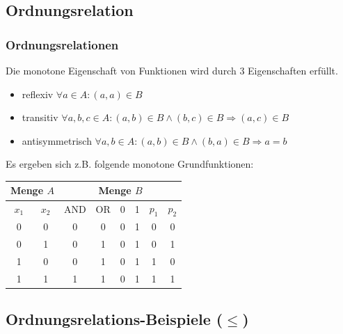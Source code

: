 \documentclass[hyperref={pdfpagelabels=false}]{beamer} %
\begin{document}
  \subsection{Ordnungsrelation}
  \begin{frame}%
    \frametitle{Ordnungsrelationen}
    Die monotone Eigenschaft von Funktionen wird durch 3 Eigenschaften erfüllt.
    \begin{itemize}
      \item reflexiv $\forall a \in A: (a,a) \in B$\\
      \item transitiv $\forall a,b,c \in A: (a,b) \in B \land (b,c) \in B \Rightarrow (a,c) \in B$\\
      \item antisymmetrisch $\forall a,b \in A: (a,b) \in B \land (b,a) \in B \Rightarrow a=b$\\
    \end{itemize}
    Es ergeben sich z.B. folgende monotone Grundfunktionen:\\
    \begin{tabular}[t]{|cc|c|c|c|c|c|c|} \hline
      \multicolumn{2}{|c|}{Menge $A$} & \multicolumn{6}{|c|}{Menge $B$} \\ \hline
      $x_1$     & $x_2$ & AND   & OR    & 0     & 1     & $p_1$ & $p_2$\\ \hline
      0         & 0     & 0     & 0     & 0     & 1     & 0     & 0\\
      0         & 1     & 0     & 1     & 0     & 1     & 0     & 1\\
      1         & 0     & 0     & 1     & 0     & 1     & 1     & 0\\
      1         & 1     & 1     & 1     & 0     & 1     & 1     & 1\\ \hline
    \end{tabular}
  \end{frame}

  \subsection{Ordnungsrelations-Beispiele ($\leq$)}
\end{document}
